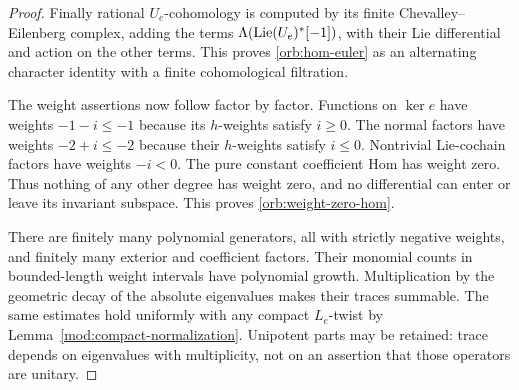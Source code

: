 \begin{proof}
Finally rational $U_e$-cohomology is computed by its finite
Chevalley--Eilenberg complex, adding the terms
$\Lambda(\operatorname{Lie}(U_e)^*[-1])$, with their Lie differential and action on
the other terms.  This proves \eqref{orb:hom-euler} as an alternating
character identity with a finite cohomological filtration.

The weight assertions now follow factor by factor.  Functions on
$\ker e$ have weights $-1-i\le-1$ because its $h$-weights satisfy
$i\ge0$.  The normal factors have weights $-2+i\le-2$ because their
$h$-weights satisfy $i\le0$.  Nontrivial Lie-cochain factors have
weights $-i<0$.  The pure constant coefficient Hom has weight zero.
Thus nothing of any other degree has weight zero, and no differential
can enter or leave its invariant subspace.  This proves
\eqref{orb:weight-zero-hom}.

There are finitely many polynomial generators, all with strictly
negative weights, and finitely many exterior and coefficient factors.
Their monomial counts in bounded-length weight intervals have
polynomial growth.  Multiplication by the geometric decay of the
absolute eigenvalues makes their traces summable.  The same estimates
hold uniformly with any compact $L_e$-twist by
Lemma~\ref{mod:compact-normalization}.  Unipotent parts may be retained:
trace depends on eigenvalues with multiplicity, not on an assertion
that those operators are unitary.
\end{proof}
